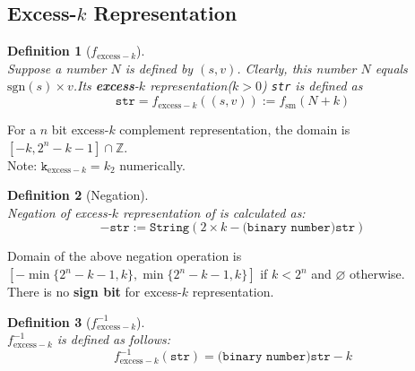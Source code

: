 \documentclass[12pt]{article}
\newtheorem{definition}{Definition}[section]
\theoremstyle{definition}
\begin{document}
\subsection{Excess-$k$ Representation}
\begin{definition}[$f_{\text{excess}-k}$]
\hfill\\\normalfont
Suppose a number $N$ is defined by $(s,v)$. Clearly, this number $N$ equals $\text{sgn}(s)\times v$.Its \textbf{excess}-$k$ representation($k>0$) \texttt{str} is defined as
\[
\texttt{str}=f_{\text{excess}-k}((s,v)):=f_\text{sm}(N+k)
\] 
\end{definition}
For a $n$ bit excess-$k$ complement representation, the domain is $[-k, 2^n-k-1]\cap \mathbb{Z}$.\\
Note: $\texttt{k}_{\text{excess}-k}=k_2$ numerically.
\begin{definition}[Negation]
\hfill\\\normalfont Negation of excess-$k$ representation of is calculated as:
\[
-\texttt{str}:=\texttt{String}(2\times k-\texttt{(binary number)} \texttt{str})
\]
\end{definition}
Domain of the above negation operation is $[-\min\{2^n-k-1,k\},\min\{2^n-k-1,k\}]$ if $k<2^n$ and $\varnothing$ otherwise.\\
There is no \textbf{sign bit} for excess-$k$ representation.
\begin{definition}[$f_{\text{excess}-k}^{-1}$]
\hfill\\\normalfont $f_{\text{excess}-k}^{-1}$ is defined as follows:
\[
f_{\text{excess}-k}^{-1}(\texttt{str})=\texttt{(binary number)} \texttt{str}-k
\]
\end{definition}
\end{document}
